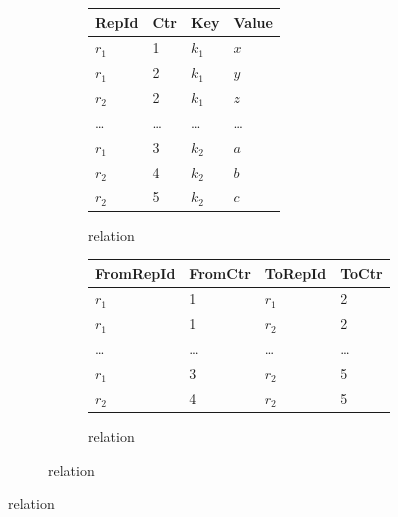 \begin{figure}[tpb]
	\centering
	\small

	\begin{subfigure}[b]{\textwidth}
		\centering
		\begin{subfigure}[b]{0.45\textwidth}
			\centering
			\begin{tabular}{@{}llll@{}}
				\toprule
				RepId   & Ctr    & Key     & Value  \\
				\midrule
				\(r_1\) & 1      & \(k_1\) & \(x\)  \\
				\(r_1\) & 2      & \(k_1\) & \(y\)  \\
				\(r_2\) & 2      & \(k_1\) & \(z\)  \\
				\midrule
				\ldots  & \ldots & \ldots  & \ldots \\
				\midrule
				\(r_1\) & 3      & \(k_2\) & \(a\)  \\
				\(r_2\) & 4      & \(k_2\) & \(b\)  \\
				\(r_2\) & 5      & \(k_2\) & \(c\)  \\
				\bottomrule
			\end{tabular}
			\caption{ relation}\label{fig:mvr-store-set}
		\end{subfigure}
		\hspace{1em}
		\begin{subfigure}[b]{0.45\textwidth}
			\centering
			\begin{tabular}{@{}llll@{}}
				\toprule
				FromRepId & FromCtr & ToRepId & ToCtr  \\
				\midrule
				\(r_1\)   & 1       & \(r_1\) & 2      \\
				\(r_1\)   & 1       & \(r_2\) & 2      \\
				\midrule
				\ldots    & \ldots  & \ldots  & \ldots \\
				\midrule
				\(r_1\)   & 3       & \(r_2\) & 5      \\
				\(r_2\)   & 4       & \(r_2\) & 5      \\
				\bottomrule
			\end{tabular}
			\caption{ relation}\label{fig:mvr-store-pred}
		\end{subfigure}
	\end{subfigure}

	\vspace{1em}


\end{figure}
